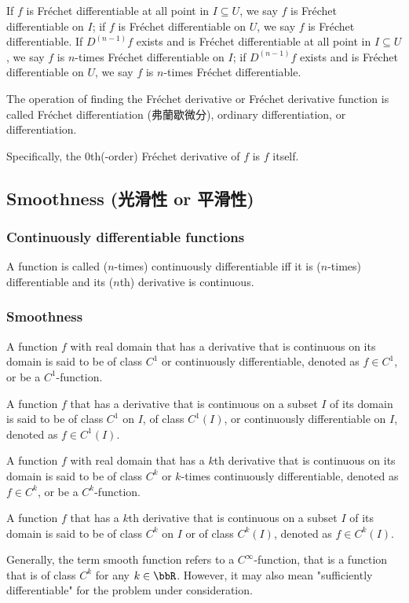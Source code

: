 If $f$ is Fréchet differentiable at all point in $I\subseteq U$, we say $f$ is Fréchet differentiable on $I$; if $f$ is Fréchet differentiable on $U$, we say $f$ is Fréchet differentiable. If $D^{(n-1)}f$ exists and is Fréchet differentiable at all point in $I\subseteq U$, we say $f$ is $n$-times Fréchet differentiable on $I$; if $D^{(n-1)}f$ exists and is Fréchet differentiable on $U$, we say $f$ is $n$-times Fréchet differentiable.

The operation of finding the Fréchet derivative or Fréchet derivative function is called Fréchet differentiation (弗蘭歇微分), ordinary differentiation, or differentiation.

Specifically, the $0$th(-order) Fréchet derivative of $f$ is $f$ itself.
\subsection{Smoothness (光滑性 or 平滑性)}
\subsubsection{Continuously differentiable functions}
A function is called ($n$-times) continuously differentiable iff it is ($n$-times) differentiable and its ($n$th) derivative is continuous.
\subsubsection{Smoothness}
A function $f$ with real domain that has a derivative that is continuous on its domain is said to be of class $C^1$ or continuously differentiable, denoted as $f\in C^1$, or be a $C^1$-function.

A function $f$ that has a derivative that is continuous on a subset $I$ of its domain is said to be of class $C^1$ on $I$, of class $C^1(I)$, or continuously differentiable on $I$, denoted as $f\in C^1(I)$.

A function $f$ with real domain that has a $k$th derivative that is continuous on its domain is said to be of class $C^k$ or $k$-times continuously differentiable, denoted as $f\in C^k$, or be a $C^k$-function.

A function $f$ that has a $k$th derivative that is continuous on a subset $I$ of its domain is said to be of class $C^k$ on $I$ or of class $C^k(I)$, denoted as $f\in C^k(I)$.

Generally, the term smooth function refers to a $C^{\infty}$-function, that is a function that is of class $C^k$ for any $k\in\bbR$. However, it may also mean "sufficiently differentiable" for the problem under consideration.
